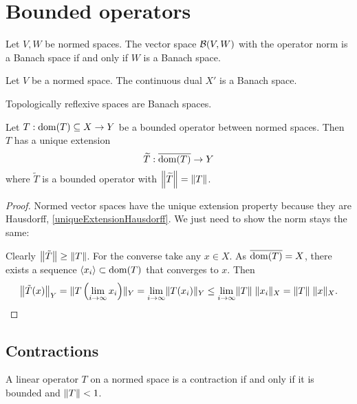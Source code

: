\section{Bounded operators}
\begin{proposition}
Let $V,W$ be normed spaces. The vector space $\Bounded(V,W)$ with the operator norm is a Banach space \textup{if and only if} $W$ is a Banach space.
\end{proposition}
\begin{corollary}
Let $V$ be a normed space. The continuous dual $X'$ is a Banach space.
\end{corollary}
\begin{corollary}
Topologically reflexive spaces are Banach spaces.
\end{corollary}

\begin{proposition} \label{BLT}
Let $T:\dom(T)\subseteq X\to Y$ be a bounded operator between normed spaces. Then $T$ has a unique extension
\[ \widetilde{T}:\overline{\dom(T)}\to Y \]
where $\widetilde{T}$ is a bounded operator with $\norm*{\widetilde{T}} = \norm{T}$.
\end{proposition}
\begin{proof}
Normed vector spaces have the unique extension property because they are Hausdorff, \ref{uniqueExtensionHausdorff}. We just need to show the norm stays the same:

Clearly $\norm*{\tilde{T}} \geq \norm{T}$. For the converse take any $x\in X$. As $\overline{\dom(T)} = X$, there exists a sequence $\seq{x_i}\subset \dom(T)$ that converges to $x$. Then
\[ \norm*{\tilde{T}(x)}_Y = \norm{T\left(\lim_{i\to\infty}x_i\right)}_Y = \lim_{i\to\infty}\norm{T(x_i)}_Y \leq \lim_{i\to\infty}\norm{T}\;\norm{x_i}_X = \norm{T}\;\norm{x}_X. \]
\end{proof}

\subsection{Contractions}
A linear operator $T$ on a normed space is a contraction if and only if it is bounded and $\norm{T}<1$. 

